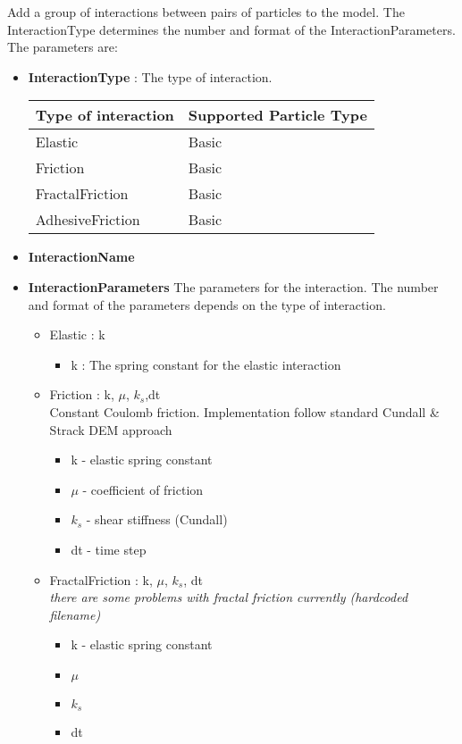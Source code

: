 \documentclass{report}
\begin{document}
Add a group of interactions between pairs of particles to the model. The InteractionType determines the number and format of the InteractionParameters. The parameters are:
\begin{itemize}
\item \textbf{InteractionType} : The type of interaction. \par
\begin{tabular}{|l|l|}
\hline
Type of interaction & Supported Particle Type \\
\hline
\hline
Elastic & Basic \\
\hline
Friction & Basic \\
\hline
FractalFriction & Basic \\
\hline
AdhesiveFriction & Basic \\
\hline
\end{tabular} 

\item \textbf{InteractionName}
\item \textbf{InteractionParameters} The parameters for the interaction. The number and format of the parameters depends on the type of interaction.
\begin{itemize}

\item Elastic : k
\begin{itemize}
\item k : The spring constant for the elastic interaction
\end{itemize}

\item Friction : k, $\mu$, $k_s$,dt \\
Constant Coulomb friction. Implementation follow standard Cundall \& Strack DEM approach
\begin{itemize}
\item k - elastic spring constant
\item $\mu$ - coefficient of friction
\item $k_s$ - shear stiffness (Cundall)
\item dt - time step
\end{itemize}

\item FractalFriction : k, $\mu$, $k_s$, dt \\
\textit{there are some problems with fractal friction currently (hardcoded filename)}
\begin{itemize}
\item k - elastic spring constant
\item $\mu$
\item $k_s$
\item dt
\end{itemize}


\end{itemize}
\end{itemize}
\end{document}
